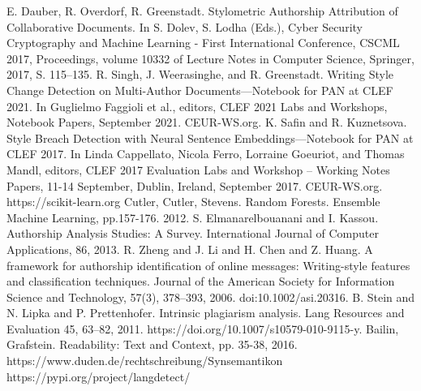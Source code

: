 \documentclass[conference]{IEEEtran}
\begin{document}
\begin{thebibliography}{00}
 E. Dauber, R. Overdorf, R. Greenstadt. Stylometric Authorship Attribution of Collaborative Documents. In S. Dolev, S. Lodha (Eds.), Cyber Security Cryptography and Machine Learning - First International Conference, CSCML 2017, Proceedings, volume 10332 of Lecture Notes in Computer Science, Springer, 2017, S. 115–135.
 R. Singh, J. Weerasinghe, and R. Greenstadt. Writing Style Change Detection on Multi-Author Documents—Notebook for PAN at CLEF 2021. In Guglielmo Faggioli et al., editors, CLEF 2021 Labs and Workshops, Notebook Papers, September 2021. CEUR-WS.org.
 K. Safin and R. Kuznetsova. Style Breach Detection with Neural Sentence Embeddings—Notebook for PAN at CLEF 2017. In Linda Cappellato, Nicola Ferro, Lorraine Goeuriot, and Thomas Mandl, editors, CLEF 2017 Evaluation Labs and Workshop – Working Notes Papers, 11-14 September, Dublin, Ireland, September 2017. CEUR-WS.org.
 https://scikit-learn.org
 Cutler, Cutler, Stevens. Random Forests. Ensemble Machine Learning, pp.157-176. 2012.
 S. Elmanarelbouanani and I. Kassou. Authorship Analysis Studies: A Survey. International Journal of Computer Applications, 86, 2013.
 R. Zheng and J. Li and H. Chen and Z. Huang. A framework for authorship identification of online messages: Writing-style features and classification techniques. Journal of the American Society for Information Science and Technology, 57(3), 378–393, 2006. doi:10.1002/asi.20316.
 B. Stein and N. Lipka and P. Prettenhofer. Intrinsic plagiarism analysis. Lang Resources and Evaluation 45, 63–82, 2011. https://doi.org/10.1007/s10579-010-9115-y.
 Bailin, Grafstein. Readability: Text and Context, pp. 35-38, 2016.
 https://www.duden.de/rechtschreibung/Synsemantikon
 https://pypi.org/project/langdetect/
\end{thebibliography}
\end{document}
